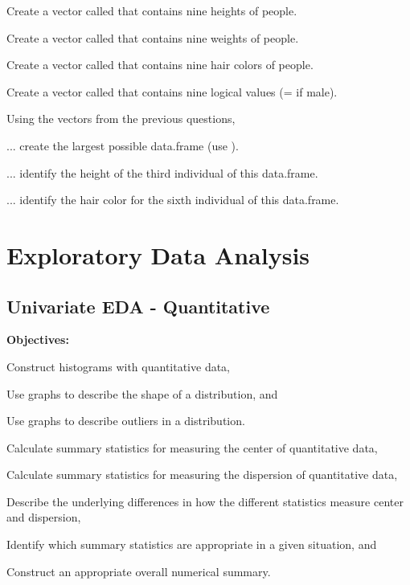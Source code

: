 \documentclass[10pt,openany]{book}\usepackage[]{graphicx}\usepackage[]{color}
\begin{document}
\begin{exsection}
  \item \label{revex:BasicsData1}\rhw{} Create a vector called  that contains nine heights of people. 
  \item \label{revex:BasicsData2}\rhw{} Create a vector called  that contains nine weights of people. 
  \item \label{revex:BasicsData3}\rhw{} Create a vector called  that contains nine hair colors of people. 
  \item \label{revex:BasicsData4}\rhw{} Create a vector called  that contains nine logical values (= if male). 
  \item \label{revex:BasicsData5}\rhw{} Using the vectors from the previous questions,  
  \begin{Enumerate}
    \item ... create the largest possible data.frame (use ).
    \item ... identify the height of the third individual of this data.frame.
    \item ... identify the hair color for the sixth individual of this data.frame.
  \end{Enumerate}
\end{exsection}

    \part{Exploratory Data Analysis}



\chapter{Univariate EDA - Quantitative} \label{chap:UnivEDAQuant}
\begin{ChapObj}{\boxwidth}
  \textbf{Objectives:}
  \begin{Enumerate}
    \item Construct histograms with quantitative data,
    \item Use graphs to describe the shape of a distribution, and
    \item Use graphs to describe outliers in a distribution.
    \item Calculate summary statistics for measuring the center of quantitative data,
    \item Calculate summary statistics for measuring the dispersion of quantitative data,
    \item Describe the underlying differences in how the different statistics measure center and dispersion,
    \item Identify which summary statistics are appropriate in a given situation, and
    \item Construct an appropriate overall numerical summary.
  \end{Enumerate}
\end{ChapObj}
\end{document}
